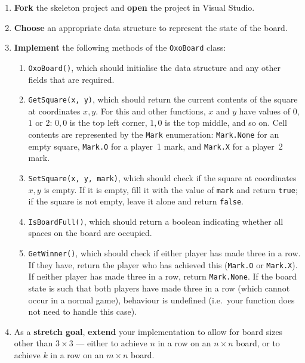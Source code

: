 \documentclass{../../../fal_assignment}
\begin{document}
\begin{enumerate}[label=(\alph*)]
	\item \textbf{Fork} the skeleton project and \textbf{open} the project in Visual Studio.
	\item \textbf{Choose} an appropriate data structure to represent the state of the board.
	\item \textbf{Implement} the following methods of the \lstinline{OxoBoard} class:
		\begin{enumerate}[label=(\roman*)]
			\item \lstinline{OxoBoard()}, which should initialise the data structure and any other fields that are required.
			\item \lstinline{GetSquare(x, y)}, which should return the current contents of the square at coordinates $x,y$.
				For this and other functions, $x$ and $y$ have values of $0$, $1$ or $2$:
				$0,0$ is the top left corner, $1,0$ is the top middle, and so on.
				Cell contents are represented by the \lstinline{Mark} enumeration: \lstinline{Mark.None} for an empty square,
				\lstinline{Mark.O} for a player~1 mark, and \lstinline{Mark.X} for a player~2 mark.
			\item \lstinline{SetSquare(x, y, mark)}, which should check if the square at coordinates $x,y$ is empty.
				If it is empty, fill it with the value of \lstinline{mark} and return \lstinline{true};
				if the square is not empty, leave it alone and return \lstinline{false}.
			\item \lstinline{IsBoardFull()}, which should return a boolean indicating whether all spaces on the board are occupied.
			\item \lstinline{GetWinner()}, which should check if either player has made three in a row.
				If they have, return the player who has achieved this (\lstinline{Mark.O} or \lstinline{Mark.X}).
				If neither player has made three in a row, return \lstinline{Mark.None}.
				If the board state is such that both players have made three in a row (which cannot occur in a normal game),
				behaviour is undefined (i.e.\ your function does not need to handle this case).
		\end{enumerate}
	\item As a \textbf{stretch goal}, \textbf{extend} your implementation to allow for board sizes other than $3 \times 3$
	    --- either to achieve $n$ in a row on an $n \times n$ board, or to achieve $k$ in a row on an $m \times n$ board.
\end{enumerate}
\end{document}
